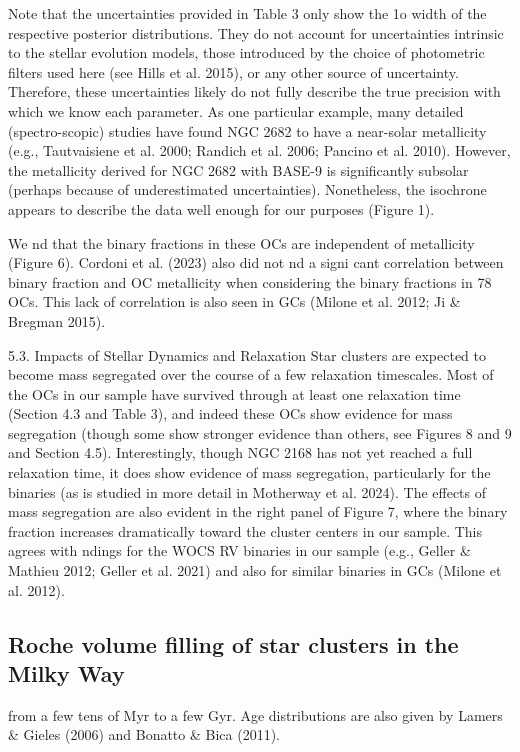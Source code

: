 \documentclass[../Main.tex]{subfiles}
\begin{document}
Note that the uncertainties provided in Table 3 only show the 1o width of the respective posterior distributions. They do not account for uncertainties intrinsic to the stellar evolution models, those introduced by the choice of photometric filters used here (see Hills et al. 2015), or any other source of uncertainty. Therefore, these uncertainties likely do not fully describe the true precision with which we know each parameter. As one particular example, many detailed (spectro-scopic) studies have found NGC 2682 to have a near-solar metallicity (e.g., Tautvaisiene et al. 2000; Randich et al. 2006;
Pancino et al. 2010). However, the metallicity derived for NGC 2682 with BASE-9 is significantly subsolar (perhaps because of underestimated uncertainties). Nonetheless, the isochrone appears to describe the data well enough for our purposes (Figure 1).

We nd that the binary fractions in these OCs are
independent of metallicity (Figure 6). Cordoni et al. (2023)
also did not nd a signi cant correlation between binary
fraction and OC metallicity when considering the binary
fractions in 78 OCs. This lack of correlation is also seen in GCs
(Milone et al. 2012; Ji & Bregman 2015).

5.3. Impacts of Stellar Dynamics and Relaxation
Star clusters are expected to become mass segregated over
the course of a few relaxation timescales. Most of the OCs in
our sample have survived through at least one relaxation time
(Section 4.3 and Table 3), and indeed these OCs show evidence for mass segregation (though some show stronger evidence
than others, see Figures 8 and 9 and Section 4.5). Interestingly,
though NGC 2168 has not yet reached a full relaxation time, it
does show evidence of mass segregation, particularly for the
binaries (as is studied in more detail in Motherway et al. 2024).
The effects of mass segregation are also evident in the right
panel of Figure 7, where the binary fraction increases
dramatically toward the cluster centers in our sample. This
agrees with ndings for the WOCS RV binaries in our sample
(e.g., Geller & Mathieu 2012; Geller et al. 2021) and also for
similar binaries in GCs (Milone et al. 2012).

\subsection{Roche volume filling of star clusters in the Milky Way}

from a few tens of Myr to a few Gyr. Age distributions are also
given by Lamers & Gieles (2006) and Bonatto & Bica (2011).
\end{document}
